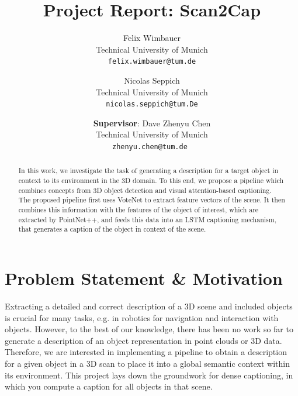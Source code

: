 \documentclass[10pt,twocolumn,letterpaper]{article}
\begin{document}
\title{Project Report: Scan2Cap}

\author{
\small Felix Wimbauer\\
\small Technical University of Munich\\
{\tt\small felix.wimbauer@tum.de}
\and
\small Nicolas Seppich\\
\small Technical University of Munich\\
{\tt\small nicolas.seppich@tum.De}
\and
\small
\textbf{Supervisor}: Dave Zhenyu Chen\\
\small
Technical University of Munich\\
{\tt\small zhenyu.chen@tum.de }
}

\maketitle

\begin{abstract}
In this work, we investigate the task of generating a description for a target object in context to its environment in the 3D domain. To this end, we propose a pipeline which combines concepts from 3D object detection and visual attention-based captioning. The proposed pipeline first uses VoteNet to extract feature vectors of the scene. It then combines this information with the features of the object of interest, which are extracted by PointNet++, and feeds this data into an LSTM captioning mechanism, that generates a caption of the object in context of the scene.
   
\end{abstract}

\section{Problem Statement \& Motivation}

Extracting a detailed and correct description of a 3D scene and included objects is crucial for many tasks, e.g. in robotics for navigation and interaction with objects.
However, to the best of our knowledge, there has been no work so far to generate a description of an object representation in point clouds or 3D data. Therefore, we are interested in implementing a pipeline to obtain a description for a given object in a 3D scan to place it into a global semantic context within its environment. This project lays down the groundwork for dense captioning, in which you compute a caption for all objects in that scene.
 
\end{document}
